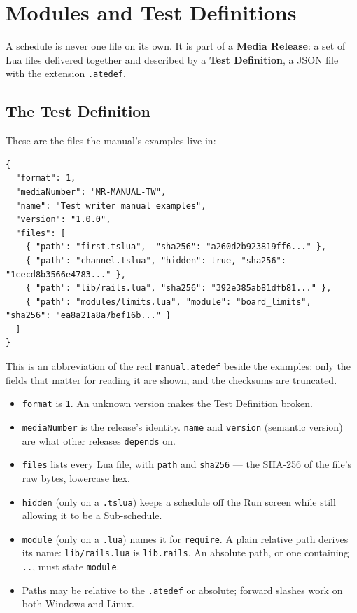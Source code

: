 \chapter{Modules and Test Definitions}\label{ch:modules}

A schedule is never one file on its own. It is part of a \textbf{Media Release}: a set of Lua
files delivered together and described by a \textbf{Test Definition}, a JSON file with the
extension \texttt{.atedef}.

\section{The Test Definition}

These are the files the manual's examples live in:

\begingroup\footnotesize
\begin{verbatim}
{
  "format": 1,
  "mediaNumber": "MR-MANUAL-TW",
  "name": "Test writer manual examples",
  "version": "1.0.0",
  "files": [
    { "path": "first.tslua",  "sha256": "a260d2b923819ff6..." },
    { "path": "channel.tslua", "hidden": true, "sha256": "1cecd8b3566e4783..." },
    { "path": "lib/rails.lua", "sha256": "392e385ab81dfb81..." },
    { "path": "modules/limits.lua", "module": "board_limits", "sha256": "ea8a21a8a7bef16b..." }
  ]
}
\end{verbatim}
\endgroup

This is an abbreviation of the real \texttt{manual.atedef} beside the examples: only the fields
that matter for reading it are shown, and the checksums are truncated.

\begin{itemize}
  \item \texttt{format} is \texttt{1}. An unknown version makes the Test Definition broken.
  \item \texttt{mediaNumber} is the release's identity. \texttt{name} and \texttt{version}
    (semantic version) are what other releases \texttt{depends} on.
  \item \texttt{files} lists every Lua file, with \texttt{path} and \texttt{sha256} --- the
    SHA-256 of the file's raw bytes, lowercase hex.
  \item \texttt{hidden} (only on a \texttt{.tslua}) keeps a schedule off the Run screen while
    still allowing it to be a Sub-schedule.
  \item \texttt{module} (only on a \texttt{.lua}) names it for \texttt{require}. A plain
    relative path derives its name: \texttt{lib/rails.lua} is \texttt{lib.rails}. An absolute
    path, or one containing \texttt{..}, must state \texttt{module}.
  \item Paths may be relative to the \texttt{.atedef} or absolute; forward slashes work on both
    Windows and Linux.
\end{itemize}

